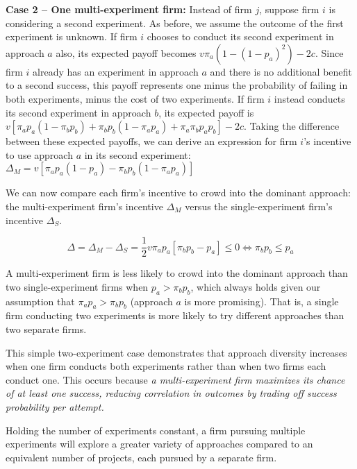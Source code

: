 \noindent \textbf{Case 2 -- One multi-experiment firm:} Instead of firm $j$, suppose firm $i$ is considering a second experiment. As before, we assume the outcome of the first experiment is unknown. If firm $i$ chooses to conduct its second experiment in approach $a$ also, its expected payoff becomes $v\pi_a\left(1 - (1 - p_a)^2\right) - 2c$. Since firm $i$ already has an experiment in approach $a$ and there is no additional benefit to a second success, this payoff represents one minus the probability of failing in both experiments, minus the cost of two experiments. If firm $i$ instead conducts its second experiment in approach $b$, its expected payoff is $v\left[{\pi_a}p_a(1-{\pi_b}p_b) + {\pi_b}p_b(1 - {\pi_a}p_a) + \pi_a\pi_bp_ap_b \right] - 2c$. Taking the difference between these expected payoffs, we can derive an expression for firm $i$'s incentive to use approach $a$ in its second experiment: $\Delta_M = v\left[\pi_ap_a(1-p_a)-\pi_bp_b(1- \pi_ap_a)\right]$


We can now compare each firm's incentive to crowd into the dominant approach: the multi-experiment firm's incentive $\Delta_M$ versus the single-experiment firm's incentive $\Delta_S$.

\begin{equation}
\Delta = \Delta_M - \Delta_S = \frac{1}{2}v\pi_ap_a\left[\pi_bp_b-p_a\right] \leq 0 \iff \pi_bp_b \leq p_a
\end{equation}

\noindent A multi-experiment firm is less likely to crowd into the dominant approach than two single-experiment firms when $p_a > \pi_bp_b$, which always holds given our assumption that $\pi_ap_a > \pi_bp_b$ (approach $a$ is more promising). That is, a single firm conducting two experiments is more likely to try different approaches than two separate firms.

This simple two-experiment case demonstrates that approach diversity increases when one firm conducts both experiments rather than when two firms each conduct one. This occurs because \textit{a multi-experiment firm maximizes its chance of at least one success, reducing correlation in outcomes by trading off success probability per attempt.}

\begin{hypothesis}\label{prop:model-choice}
    Holding the number of experiments constant, a firm pursuing multiple experiments will explore a greater variety of approaches compared to an equivalent number of projects, each pursued by a separate firm.
\end{hypothesis}

